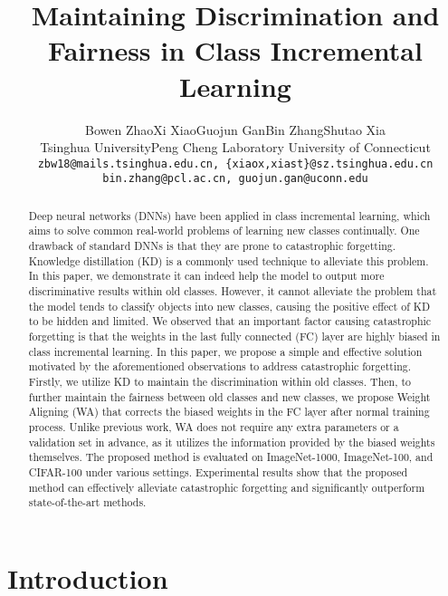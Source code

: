 \documentclass[10pt,twocolumn,letterpaper]{article}
\begin{document}
\title{Maintaining Discrimination and Fairness in Class Incremental Learning}

\author{Bowen Zhao\quad Xi Xiao\quad Guojun Gan\quad Bin Zhang\quad Shutao Xia\\
Tsinghua University\quad Peng Cheng Laboratory \quad University of Connecticut\\
{\tt\small zbw18@mails.tsinghua.edu.cn, \{xiaox,xiast\}@sz.tsinghua.edu.cn}\\ {\tt\small bin.zhang@pcl.ac.cn, guojun.gan@uconn.edu}
} 

\maketitle

\begin{abstract}
Deep neural networks (DNNs) have been applied in class incremental learning, which aims to solve common real-world problems of learning new classes continually. One drawback of standard DNNs is that they are prone to catastrophic forgetting. Knowledge distillation (KD) is a commonly used technique to alleviate this problem. In this paper, we demonstrate it can indeed help the model to output more discriminative results within old classes. However, it cannot alleviate the problem that the model tends to classify objects into new classes, causing the positive effect of KD to be hidden and limited. We observed that an important factor causing catastrophic forgetting is that the weights in the last fully connected (FC) layer are highly biased in class incremental learning. In this paper, we propose a simple and effective solution motivated by the aforementioned observations to address catastrophic forgetting. Firstly, we utilize KD to maintain the discrimination within old classes. Then, to further maintain the fairness between old classes and new classes, we propose Weight Aligning (WA) that corrects the biased weights in the FC layer after normal training process. Unlike previous work, WA does not require any extra parameters or a validation set in advance, as it utilizes the information provided by the biased weights themselves. The proposed method is evaluated on ImageNet-1000, ImageNet-100, and CIFAR-100 under various settings. Experimental results show that the proposed method can effectively alleviate catastrophic forgetting and significantly outperform state-of-the-art methods.
\end{abstract}


\section{Introduction}
\end{document}
